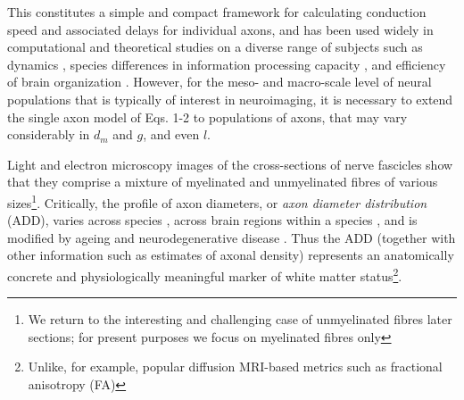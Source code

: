 

This constitutes a simple and compact framework for calculating conduction speed and associated delays for individual axons, and has been used widely in computational and theoretical studies on a diverse range of subjects such as dynamics \citep{bojak2010axonal}, species differences in information processing capacity \citep{caminiti2009evolution}, and efficiency of brain organization \citep{chomiak2009what}. However, for the meso- and macro-scale level of neural populations that is typically of interest in neuroimaging, it is necessary to extend the single axon model of Eqs. 1-2 to  populations of axons, that may vary considerably in $d_m$ and $g$, and even $l$. 

Light and electron microscopy images of the cross-sections of nerve fascicles show that they comprise a mixture of myelinated and unmyelinated fibres of various sizes\footnote{We return to the interesting and challenging case of unmyelinated fibres later sections; for present purposes we focus on myelinated fibres only}. Critically, the profile of axon diameters, or \textit{axon diameter distribution} (ADD), varies across species \citep{caminiti2013diameter}, across brain regions within a species \citep{aboitiz1992fiber,innocenti2010fiber}, and is modified by ageing and neurodegenerative disease \cite{peters2009the}. Thus the ADD (together with other information such as estimates of axonal density) represents an anatomically concrete and physiologically meaningful marker of white matter status\footnote{Unlike, for example, popular diffusion MRI-based metrics such as fractional anisotropy (FA)}. 
